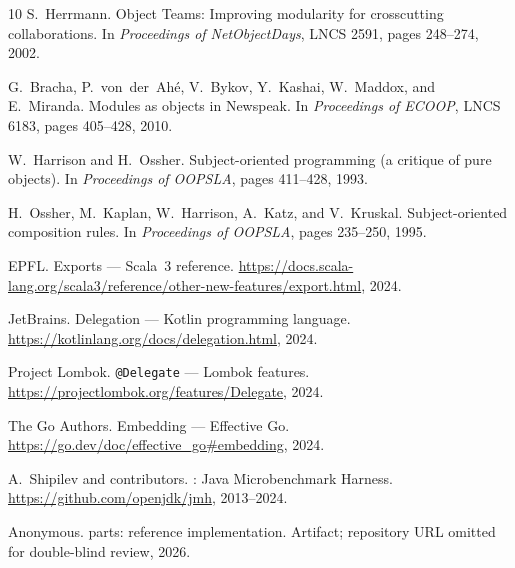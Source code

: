 \documentclass[acmsmall,screen,review,anonymous]{acmart}
\theoremstyle{acmplain}
\begin{document}
\begin{thebibliography}{10}
S.~Herrmann.
\newblock Object {Teams}: Improving modularity for crosscutting collaborations.
\newblock In {\em Proceedings of NetObjectDays}, LNCS 2591, pages 248--274, 2002.

G.~Bracha, P.~von~der~Ah{\'e}, V.~Bykov, Y.~Kashai, W.~Maddox, and E.~Miranda.
\newblock Modules as objects in {Newspeak}.
\newblock In {\em Proceedings of ECOOP}, LNCS 6183, pages 405--428, 2010.

W.~Harrison and H.~Ossher.
\newblock Subject-oriented programming (a critique of pure objects).
\newblock In {\em Proceedings of OOPSLA}, pages 411--428, 1993.

H.~Ossher, M.~Kaplan, W.~Harrison, A.~Katz, and V.~Kruskal.
\newblock Subject-oriented composition rules.
\newblock In {\em Proceedings of OOPSLA}, pages 235--250, 1995.

EPFL.
\newblock Exports --- {Scala~3} reference.
\newblock \url{https://docs.scala-lang.org/scala3/reference/other-new-features/export.html}, 2024.

JetBrains.
\newblock Delegation --- {Kotlin} programming language.
\newblock \url{https://kotlinlang.org/docs/delegation.html}, 2024.

Project Lombok.
\newblock \texttt{@Delegate} --- {Lombok} features.
\newblock \url{https://projectlombok.org/features/Delegate}, 2024.

The Go Authors.
\newblock Embedding --- Effective {Go}.
\newblock \url{https://go.dev/doc/effective_go#embedding}, 2024.

A.~Shipilev and contributors.
: Java Microbenchmark Harness.
\newblock \url{https://github.com/openjdk/jmh}, 2013--2024.

Anonymous.
\newblock parts: reference implementation.
\newblock Artifact; repository URL omitted for double-blind review, 2026.

\end{thebibliography}
\end{document}
